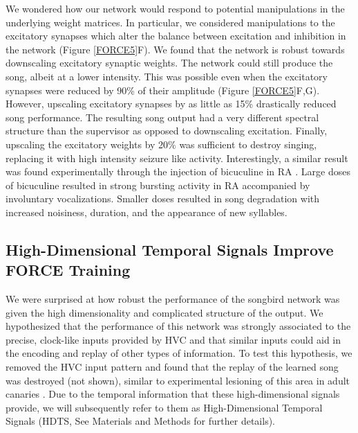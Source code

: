 \documentclass[11pt]{article} %
\begin{document}
We wondered how our network would respond to potential manipulations in the underlying weight matrices. In particular, we considered manipulations to the excitatory synapses which alter the balance between excitation and inhibition in the network (Figure \ref{FORCE5}F).  We found that the network is robust towards downscaling excitatory synaptic weights.  The network could still produce the song, albeit at a lower intensity.   This was possible even when the excitatory synapses were reduced by 90\% of their amplitude (Figure \ref{FORCE5}F,G).  However, upscaling excitatory synapses by as little as 15\% drastically reduced song performance.  The resulting song output had a very different spectral structure than the supervisor as opposed to downscaling excitation.  Finally, upscaling the excitatory weights by 20\% was sufficient to destroy singing, replacing it with high intensity seizure like activity.   Interestingly, a similar result was found experimentally through the injection of bicuculine in RA \cite{bic}.   Large doses of bicuculine resulted in strong bursting activity in RA accompanied by involuntary vocalizations.  Smaller doses resulted in song degradation with increased noisiness, duration, and the appearance of new syllables.  

\subsection*{High-Dimensional Temporal Signals Improve FORCE Training}

 We were surprised at how robust the performance of the songbird network was given the high dimensionality and complicated structure of the output.  We hypothesized that the performance of this network was strongly associated to the precise, clock-like inputs provided by HVC and that similar inputs could aid in the encoding and replay of other types of information.  To test this hypothesis, we removed the HVC input pattern and found that the replay of the learned song was destroyed (not shown), similar to experimental lesioning of this area in adult canaries \cite{nottebohm}.   Due to the temporal information that these high-dimensional signals provide, we will subsequently refer to them as High-Dimensional Temporal Signals (HDTS, See Materials and Methods for further details).   
\end{document}
